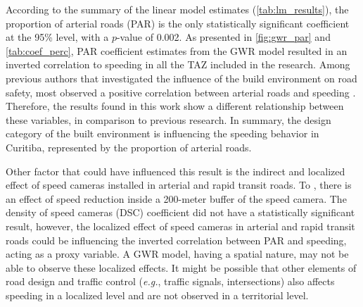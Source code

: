 

According to the summary of the linear model estimates (\autoref{tab:lm_results}), the proportion of arterial roads (PAR) is the only statistically significant coefficient at the 95\% level, with a $p$-value of 0.002. As presented in \autoref{fig:gwr_par} and \autoref{tab:coef_perc}, PAR coefficient estimates from the GWR model resulted in an inverted correlation to speeding in all the TAZ included in the research. Among previous authors that investigated the influence of the build environment on road safety, most observed a positive correlation between arterial roads and speeding \cite{Dumbaugh2011,Ewing2009, Huang2018,Obelheiro2020}. Therefore, the results found in this work show a different relationship between these variables, in comparison to previous research. In summary, the design category of the built environment is influencing the speeding behavior in Curitiba, represented by the proportion of arterial roads. 



Other factor that could have influenced this result is the indirect and localized effect of speed cameras installed in arterial and rapid transit roads. To \textcite{Li2013a, Oliveira2015}, there is an effect of speed reduction inside a 200-meter buffer of the speed camera. The density of speed cameras (DSC) coefficient did not have a statistically significant result, however, the localized effect of speed cameras in arterial and rapid transit roads could be influencing the inverted correlation between PAR and speeding, acting as a proxy variable. A GWR model, having a spatial nature, may not be able to observe these localized effects. It might be possible that other elements of road design and traffic control (\textit{e.g.}, traffic signals, intersections) also affects speeding in a localized level and are not observed in a territorial level.

